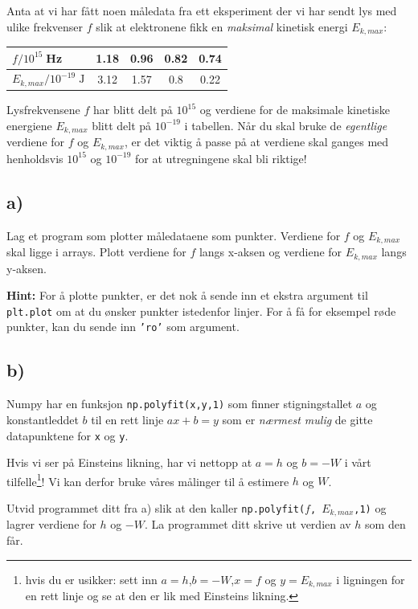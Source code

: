 \documentclass[10pt,a4paper]{article}
\begin{document}
Anta at vi har fått noen måledata fra ett eksperiment der vi har sendt lys med ulike frekvenser $f$ slik at elektronene fikk en \textit{maksimal} kinetisk energi $E_{k,max}$:
\begin{center}
\begin{tabular}{l|c|c|c|c}
	$f/10^{15}\;$Hz & 1.18 & 0.96 & 0.82 & 0.74 \\ \hline
	$E_{k,max}/10^{-19}\;\mathrm{J}$ & 3.12 & 1.57 & 0.8 &  0.22
\end{tabular}
\end{center}
Lysfrekvensene $f$ har blitt delt på $10^{15}$ og verdiene for de maksimale kinetiske energiene $E_{k,max}$ blitt delt på $10^{-19}$ i tabellen. Når du skal bruke de \textit{egentlige} verdiene for $f$ og $E_{k,max}$, er det viktig å passe på at verdiene skal ganges med henholdsvis $10^{15}$ og $10^{-19}$ for at utregningene skal bli riktige!


\subsection*{a)}
Lag et program som plotter måledataene som punkter. Verdiene for $f$ og $E_{k,max}$ skal ligge i arrays. Plott verdiene for $f$ langs x-aksen og verdiene for $E_{k,max}$ langs y-aksen.

\textbf{Hint:}
For å plotte punkter, er det nok å sende inn et ekstra argument til \texttt{plt.plot} om at du ønsker punkter istedenfor linjer. For å få for eksempel røde punkter, kan du sende inn \texttt{'ro'} som argument.

\subsection*{b)}
Numpy har en funksjon \texttt{np.polyfit(x,y,1)} som finner stigningstallet $a$ og konstantleddet $b$ til en rett linje $ax + b = y$ som er  \textit{nærmest mulig} de gitte datapunktene for \texttt{x} og \texttt{y}.

Hvis vi ser på Einsteins likning, har vi nettopp at $a = h$ og $b = -W$ i vårt tilfelle\footnote{hvis du er usikker: sett inn $a = h$,$b = -W$,$x = f$ og $y = E_{k,max}$ i ligningen for en rett linje og se at den er lik med Einsteins likning.}! Vi kan derfor bruke våres målinger til å estimere $h$ og $W$.

Utvid programmet ditt fra a) slik at den kaller \texttt{np.polyfit($f$, $E_{k,max}$,1)} og lagrer verdiene for $h$ og $-W$. La programmet ditt skrive ut verdien av $h$ som den får.
\end{document}
